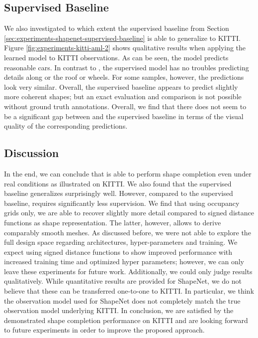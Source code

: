 \subsection{Supervised Baseline}

We also investigated to which extent the supervised baseline from Section
\ref{sec:experiments-shapenet-supervised-baseline} is able to generalize to KITTI.
Figure \ref{fig:experiments-kitti-aml-2} shows qualitative results when
applying the learned model to KITTI observations. As can be seen, the model
predicts reasonable cars. In contrast to \AML,
the supervised model has no troubles predicting details along or the roof
or wheels. For some samples, however,
the predictions look very similar. Overall, the supervised baseline
appears to predict slightly more coherent shapes; but an exact evaluation and
comparison is not possible without ground truth annotations.
Overall, we find that there does not seem to be a significant gap between
\AML and the supervised baseline in terms of the visual quality of
the corresponding predictions.

\subsection{Discussion}

In the end, we can conclude that \AML is able to perform shape completion even under
real conditions as illustrated on KITTI. We also found that the supervised baseline
generalizes surprisingly well. However, compared to the supervised baseline,
\AML requires significantly less supervision. We find that using occupancy grids only,
we are able to recover slightly more detail compared to signed distance functions
as shape representation. The latter, however, allows to derive comparably smooth
meshes. As discussed before, we were not able to explore the full design space
regarding architectures, hyper-parameters and training. We expect \AML
using signed distance functions to show improved performance with increased
training time and optimized hyper parameters; however, we can only leave these
experiments for future work. Additionally, we could only judge results
qualitatively. While quantitative results are provided for ShapeNet, we do not
believe that these can be transferred one-to-one to KITTI. In particular,
we think the observation model used for ShapeNet does not completely match the true
observation model underlying KITTI. In conclusion, we are satisfied by the
demonstrated shape completion performance on KITTI and are looking forward to
future experiments in order to improve the proposed approach.

